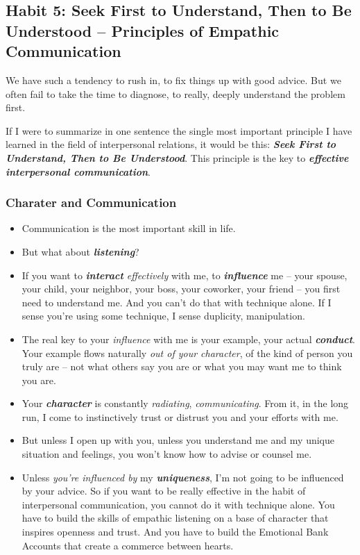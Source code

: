 \documentclass[11pt]{article}
\begin{document}
\subsection{Habit 5: Seek First to Understand, Then to Be Understood -- Principles of Empathic Communication}
We have such a tendency to rush in, to fix things up with good advice. But we often fail to take the time to diagnose, to really, deeply understand the problem first.

If I were to summarize in one sentence the single most important principle I have learned in the field of interpersonal relations, it would be this: \emph{\textbf{Seek First to Understand, Then to Be Understood}}. This principle is the key to \emph{\textbf{effective interpersonal communication}}.
\subsubsection{Charater and Communication}
\begin{itemize}
\item Communication is the most important skill in life. 

\item But what about \emph{\textbf{listening}}? 

\item If you want to \emph{\textbf{interact} effectively} with me, to \emph{\textbf{influence}} me -- your spouse, your child, your neighbor, your boss, your coworker, your friend -- you first need to understand me. And you can't do that with technique alone. If I sense you're using some technique, I sense duplicity, manipulation.

\item The real key to your \emph{influence} with me is your example, your actual \emph{\textbf{conduct}}. Your example flows naturally \emph{out of your character}, of the kind of person you truly are -- not what others say you are or what you may want me to think you are.

\item Your \emph{\textbf{character}} is constantly \emph{radiating}, \emph{communicating}. From it, in the long run, I come to instinctively trust or distrust you and your efforts with me.

\item But unless I open up with you, unless you understand me and my unique situation and feelings, you won't know how to advise or counsel me.

\item Unless \emph{you're influenced by} my \emph{\textbf{uniqueness}}, I'm not going to be influenced by your advice. So if you want to be really effective in the habit of interpersonal communication, you cannot do it with technique alone. You have to build the skills of empathic listening on a base of character that inspires openness and trust. And you have to build the Emotional Bank Accounts that create a commerce between hearts.
\end{itemize}
\end{document}
